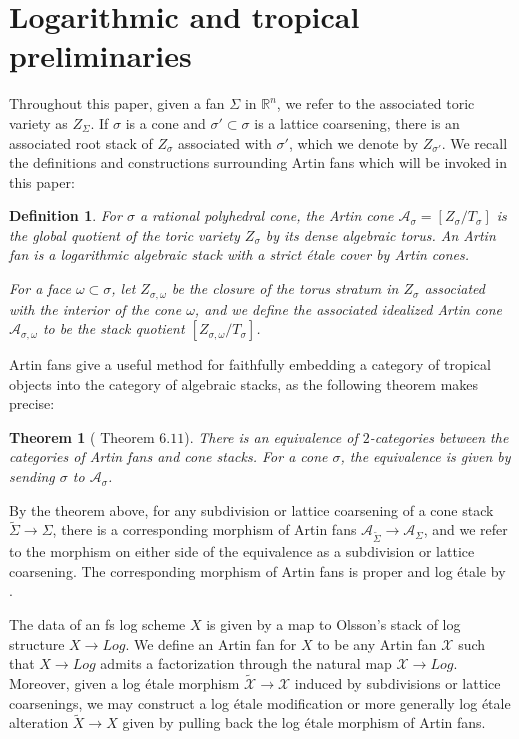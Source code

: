 \documentclass[12pt, oneside]{amsart}   	%
\newcounter{thm}
\newtheorem{definition}[thm]{Definition}
\newtheorem{theorem}[thm]{Theorem}
\numberwithin{equation}{section}
\numberwithin{thm}{section}
\numberwithin{figure}{section}
\begin{document}
\section{Logarithmic and tropical preliminaries}

Throughout this paper, given a fan $\Sigma$ in $\mathbb{R}^n$, we refer to the associated toric variety as $Z_{\Sigma}$. If $\sigma$ is a cone and $\sigma'\subset \sigma$ is a lattice coarsening, there is an associated root stack of $Z_\sigma$ associated with $\sigma'$, which we denote by $Z_{\sigma'}$. We recall the definitions and constructions surrounding Artin fans which will be invoked in this paper:

\begin{definition}
For $\sigma$ a rational polyhedral cone, the Artin cone  $\mathcal{A}_{\sigma} = [Z_{\sigma}/T_{\sigma}]$ is the global quotient of the toric variety $Z_{\sigma}$ by its dense algebraic torus. An Artin fan is a logarithmic algebraic stack with a strict \'etale cover by Artin cones.

For a face $\omega \subset \sigma$, let $Z_{\sigma,\omega}$ be the closure of the torus stratum in $Z_\sigma$ associated with the interior of the cone $\omega$, and we define the associated idealized Artin cone $\mathcal{A}_{\sigma,\omega}$ to be the stack quotient $[Z_{\sigma,\omega}/T_{\sigma}]$. 
\end{definition}


Artin fans give a useful method for faithfully embedding a category of tropical objects into the category of algebraic stacks, as the following theorem makes precise:

\begin{theorem}[\cite{stacktrop} Theorem $6.11$]
There is an equivalence of $2$-categories between the categories of Artin fans and cone stacks. For a cone $\sigma$, the equivalence is given by sending $\sigma$ to $\mathcal{A}_\sigma$. 
\end{theorem}
By the theorem above, for any subdivision or lattice coarsening of a cone stack $\widetilde{\Sigma} \rightarrow \Sigma$, there is a corresponding morphism of Artin fans $\mathcal{A}_{\widetilde{\Sigma}} \rightarrow \mathcal{A}_{\Sigma}$, and we refer to the morphism on either side of the equivalence as a subdivision or lattice coarsening. The corresponding morphism of Artin fans is proper and log \'etale by \cite[Theorem $2.4.1$]{bir_GW}.

The data of an fs log scheme $X$ is given by a map to Olsson's stack of log structure $X \rightarrow Log$. We define an Artin fan for $X$ to be any Artin fan $\mathcal{X}$ such that $X \rightarrow Log$ admits a factorization through the natural map $\mathcal{X} \rightarrow Log$. Moreover, given a log \'etale morphism $\widetilde{\mathcal{X}} \rightarrow \mathcal{X}$ induced by subdivisions or lattice coarsenings, we may construct a log \'etale modification or more generally log \'etale alteration $\widetilde{X} \rightarrow X$ given by pulling back the log \'etale morphism of Artin fans. 
\end{document}

